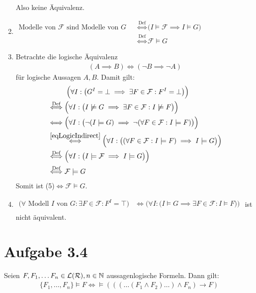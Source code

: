 \documentclass[12pt,a4paper]{article}
\newcommand{\F}{\mathcal{F}}
\begin{document}
\begin{enumerate}[label=(\arabic*)]
Also keine Äquivalenz.
\item $\begin{aligned}
\text{Modelle von $\F$ sind Modelle von $G$ }
&\stackrel{\text{Def}}{\Longleftrightarrow}
\big(I\models\F\implies I\models G\big)\\
&\stackrel{\text{Def}}{\Longleftrightarrow}
\F\models G
\end{aligned}$
\item Betrachte die logische Äquivalenz
\begin{align}\label{eqLogicIndirect}
(A\implies B)\Longleftrightarrow(\neg B\implies\neg A)
\end{align}
für logische Aussagen $A,B$. Damit gilt:
\begin{align*}
&~~\qquad\Big(\forall I:\big(G^I=\bot\implies\exists F\in\F:F^I=\bot\big)\Big)\\
&\stackrel{\text{Def}}{\Longleftrightarrow}
\Big(\forall I:\big(I\not\models G\implies\exists F\in\F:I\not\models F\big)\Big)\\
&\stackrel{\text{}}{\Longleftrightarrow}
\Big(\forall I:\big(\neg(I\models G)\implies\neg(\forall F\in\F:I\models F)\big)\Big)\\
&\stackrel{\eqref{eqLogicIndirect}}{\Longleftrightarrow}
\Big(\forall I:\big((\forall F\in\F:I\models F)\implies I\models G\big)\Big)\\
&\stackrel{\text{Def}}{\Longleftrightarrow}
\Big(\forall I:\big(I\models \F\implies I\models G\big)\Big)\\
&\stackrel{\text{Def}}{\Longleftrightarrow}
\F\models G
\end{align*}
Somit ist (5)$\Longleftrightarrow\F\models G$.
\item $\begin{aligned}
\Big(\forall\text{ Modell $I$ von }G:\exists F\in\F:F^I=\top\Big)
&\stackrel{}{\Longleftrightarrow}
\Big(\forall I:\big(I\models G\implies \exists F\in\F:I\models F\big)\Big)\\
\end{aligned}$
ist nicht äquivalent. 
\end{enumerate}

\section*{Aufgabe 3.4}
Seien $F,F_1,\ldots F_n\in\mathcal{L}(\mathcal{R}),n\in\mathbb{N}$ aussagenlogische Formeln. Dann gilt:
\begin{align*}
\lbrace F_1,\ldots, F_n\rbrace\models F\Longleftrightarrow\models(((\ldots(F_1\wedge F_2)\ldots)\wedge F_n)\to F)
\end{align*}
\end{document}
